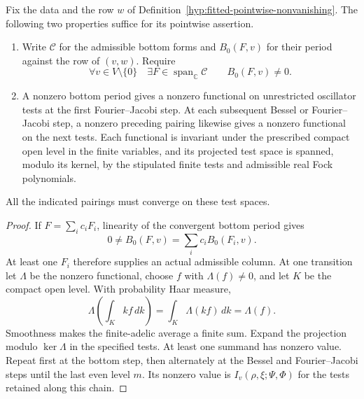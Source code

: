 \begin{lemma}\label{lem:fitted-grid-ascent-criterion}
Fix the data and the row \(w\) of Definition~\ref{hyp:fitted-pointwise-nonvanishing}. The following two properties suffice for its pointwise assertion.
\begin{enumerate}
\item Write \(\mathcal C\) for the admissible bottom forms and \(B_0(F,v)\) for their period against the row of \((v,w)\). Require
\[
 \forall v\in V\setminus\{0\}\quad\exists F\in\operatorname{span}_{\mathbb C}\mathcal C
                  \qquad B_0(F,v)\ne0 .
\]
\item A nonzero bottom period gives a nonzero functional on unrestricted oscillator tests at the first Fourier--Jacobi step. At each subsequent Bessel or Fourier--Jacobi step, a nonzero preceding pairing likewise gives a nonzero functional on the next tests. Each functional is invariant under the prescribed compact open level in the finite variables, and its projected test space is spanned, modulo its kernel, by the stipulated finite tests and admissible real Fock polynomials.
\end{enumerate}
All the indicated pairings must converge on these test spaces.
\end{lemma}

\begin{proof}
If \(F=\sum_i c_iF_i\), linearity of the convergent bottom period gives
\[
 0\ne B_0(F,v)=\sum_i c_i B_0(F_i,v).
\]
At least one \(F_i\) therefore supplies an actual admissible column. At one transition let \(\Lambda\) be the nonzero functional, choose \(f\) with \(\Lambda(f)\ne0\), and let \(K\) be the compact open level. With probability Haar measure,
\[
  \Lambda\!\left(\int_K kf\,dk\right)=\int_K\Lambda(kf)\,dk=\Lambda(f).
\]
Smoothness makes the finite-adelic average a finite sum. Expand the projection modulo \(\ker\Lambda\) in the specified tests. At least one summand has nonzero value. Repeat first at the bottom step, then alternately at the Bessel and Fourier--Jacobi steps until the last even level \(m\). Its nonzero value is \(I_v(\rho,\xi;\Psi,\Phi)\) for the tests retained along this chain.
\end{proof}

